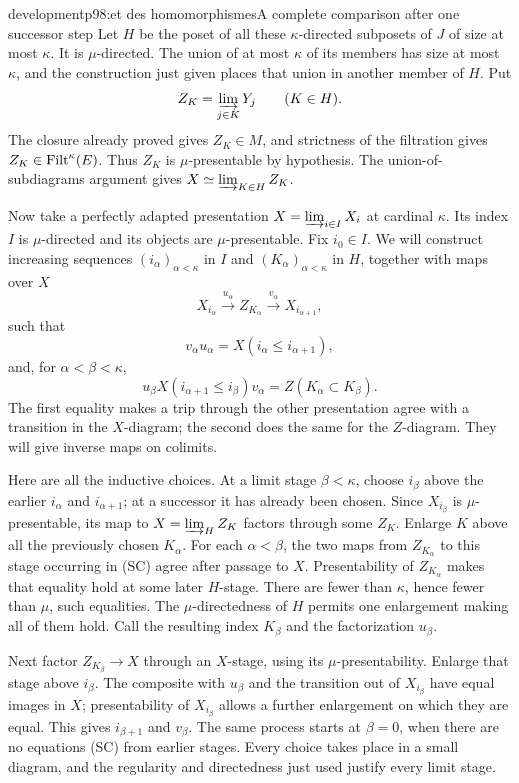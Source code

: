 \begin{dcomment}{development}{p98:et des homomorphismes}{A complete comparison after one successor step}
Let $H$ be the poset of all these $\kappa$-directed subposets of $J$ of size at most $\kappa$. It is $\mu$-directed. The union of at most $\kappa$ of its members has size at most $\kappa$, and the construction just given places that union in another member of $H$. Put
\[
 Z_K=\varinjlim_{j\in K}Y_j\qquad(K\in H).
\]
The closure already proved gives $Z_K\in M$, and strictness of the filtration gives $Z_K\in\mathrm{Filt}^\kappa(E)$. Thus $Z_K$ is $\mu$-presentable by hypothesis. The union-of-subdiagrams argument gives $X\simeq\varinjlim_{K\in H}Z_K$.

Now take a perfectly adapted presentation $X=\varinjlim_{i\in I}X_i$ at cardinal $\kappa$. Its index $I$ is $\mu$-directed and its objects are $\mu$-presentable. Fix $i_0\in I$. We will construct increasing sequences $(i_\alpha)_{\alpha<\kappa}$ in $I$ and $(K_\alpha)_{\alpha<\kappa}$ in $H$, together with maps over $X$
\[
 X_{i_\alpha}\xrightarrow{u_\alpha}Z_{K_\alpha}
       \xrightarrow{v_\alpha}X_{i_{\alpha+1}},
\]
such that
\[
 v_\alpha u_\alpha=X(i_\alpha\leq i_{\alpha+1}),
\]
and, for $\alpha<\beta<\kappa$,
\[
 u_\beta X(i_{\alpha+1}\leq i_\beta)v_\alpha
       =Z(K_\alpha\subset K_\beta).                 \tag{SC}
\]
The first equality makes a trip through the other presentation agree with a transition in the $X$-diagram; the second does the same for the $Z$-diagram. They will give inverse maps on colimits.

Here are all the inductive choices. At a limit stage $\beta<\kappa$, choose $i_\beta$ above the earlier $i_\alpha$ and $i_{\alpha+1}$; at a successor it has already been chosen. Since $X_{i_\beta}$ is $\mu$-presentable, its map to $X=\varinjlim_H Z_K$ factors through some $Z_K$. Enlarge $K$ above all the previously chosen $K_\alpha$. For each $\alpha<\beta$, the two maps from $Z_{K_\alpha}$ to this stage occurring in (SC) agree after passage to $X$. Presentability of $Z_{K_\alpha}$ makes that equality hold at some later $H$-stage. There are fewer than $\kappa$, hence fewer than $\mu$, such equalities. The $\mu$-directedness of $H$ permits one enlargement making all of them hold. Call the resulting index $K_\beta$ and the factorization $u_\beta$.

Next factor $Z_{K_\beta}\to X$ through an $X$-stage, using its $\mu$-presentability. Enlarge that stage above $i_\beta$. The composite with $u_\beta$ and the transition out of $X_{i_\beta}$ have equal images in $X$; presentability of $X_{i_\beta}$ allows a further enlargement on which they are equal. This gives $i_{\beta+1}$ and $v_\beta$. The same process starts at $\beta=0$, when there are no equations (SC) from earlier stages. Every choice takes place in a small diagram, and the regularity and directedness just used justify every limit stage.


\end{dcomment}
